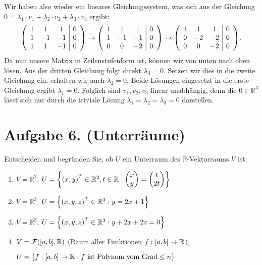 \documentclass[german,12pt]{homework}
\newcommand{\RR}{\mathbb{R}}
\DeclarePairedDelimiter{\enbrace}{(}{)}
\DeclarePairedDelimiter{\benbrace}{[}{]}
\DeclarePairedDelimiter{\penbrace}{\{}{\}}
\begin{document}
\begin{enumerate}
        Wir haben also wieder ein lineares Gleichungssystem, was sich aus der Gleichung \(0 = \lambda_1 \cdot v_1 + \lambda_2 \cdot v_2 + \lambda_3 \cdot v_3\) ergibt:
        \[\enbrace*{\begin{array}{ccc|c}
            1 & 1 & 1 & 0\\
            1 & -1 & -1 & 0\\
            1 & 1 & -1 & 0
        \end{array}} \to \enbrace*{\begin{array}{ccc|c}
            1 & 1 & 1 & 0\\
            1 & -1 & -1 & 0\\
            0 & 0 & -2 & 0
        \end{array}} \to \enbrace*{\begin{array}{ccc|c}
            1 & 1 & 1 & 0\\
            0 & -2 & -2 & 0\\
            0 & 0 & -2 & 0
        \end{array}}.\]
        Da nun unsere Matrix in Zeilenstufenform ist, können wir von unten nach oben lösen. Aus der dritten Gleichung folgt direkt \(\lambda_3 = 0\). Setzen wir dies in die zweite Gleichung ein, erhalten wir auch \(\lambda_2 = 0\). Beide Lösungen eingesetzt in die erste Gleichung ergibt \(\lambda_1 = 0\). Folglich sind \(v_1, v_2, v_3\) linear unabhängig, denn die \(0 \in \RR^3\) lässt sich nur durch die triviale Lösung \(\lambda_1 = \lambda_2 = \lambda_3 = 0\) darstellen.
    \end{enumerate}

    \section*{Aufgabe 6. (Unterräume)}

    \begin{problem}
        Entscheiden und begründen Sie, ob \(U\) ein Unterraum des \(\RR\)-Vektorraums \(V\) ist:
        \begin{enumerate}
            \item \(V = \RR^2\), \(U = \penbrace*{\enbrace*{x, y}^T \in \RR^2, t \in \RR: \begin{pmatrix}x\\y\end{pmatrix} = \begin{pmatrix}t\\2t\end{pmatrix}}\)
            \item \(V = \RR^3\), \(U = \penbrace*{\enbrace*{x, y, z}^T \in \RR^3: y = 2x + 1}\)
            \item \(V = \RR^3\), \(U = \penbrace*{\enbrace*{x, y, z}^T \in \RR^3: y + 2x + 2z = 0}\)
            \item \(V = \mathcal{F}\enbrace*{\benbrace*{a, b}, \RR}\) (Raum aller Funktionen \(f: \benbrace*{a, b} \to \RR\)),

            \(U = \penbrace*{f: \benbrace*{a, b} \to \RR: f\text{ ist Polynom vom Grad}\le n}\)
        \end{enumerate}
    \end{problem}
\end{document}
